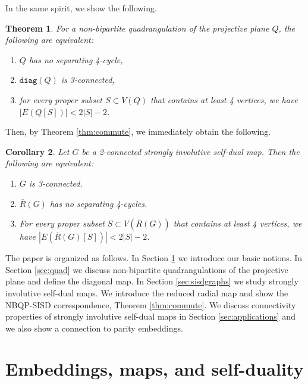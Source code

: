 \documentclass{article}
\newtheorem{theorem}{Theorem}[section]
\newtheorem{corollary}[theorem]{Corollary}
\newcommand{\diag}[0]{\mathtt{diag}}
\begin{document}
In the same spirit, we show the following.  

\begin{theorem}\label{thm:3connected}
     For a non-bipartite quadrangulation of the projective plane $Q$, the following are equivalent:
     \begin{enumerate}
         \item[a)] $Q$ has no separating 4-cycle,
         \item[b)] $\diag(Q)$ is 3-connected,
         \item[c)] for every proper subset $S\subset V(Q)$ that contains at least 4 vertices, we have $|E(Q[S])|< 2|S|-2$.
     \end{enumerate}
\end{theorem}

Then,  by Theorem \ref{thm:commute}, we immediately obtain the following.
 
\begin{corollary}\label{col:3conequiv}
    Let $G$ be a 2-connected strongly involutive self-dual map. Then the following are equivalent:
    \begin{enumerate}
        \item $G$ is 3-connected.
        \item $\overline R(G)$ has no separating 4-cycles.
        \item For every proper subset $S\subset V(\overline R(G))$ that contains at least 4 vertices, we have $|E(\overline R(G)[S])|< 2|S|-2$.
    \end{enumerate}
    
\end{corollary}






The paper is organized as follows. In Section \ref{sec:notions} we introduce our basic notions. In Section \ref{sec:quad} we discuss non-bipartite quadrangulations of the projective plane and define the diagonal map. In Section \ref{sec:sisdgraphs} we study strongly involutive self-dual maps. We introduce the reduced radial map and show the NBQP-SISD correspondence, Theorem \ref{thm:commute}. We discuss connectivity properties of strongly involutive self-dual maps in Section \ref{sec:applications} and we also show a connection to parity embeddings.  



\section{Embeddings, maps, and self-duality}\label{sec:notions}
\end{document}
